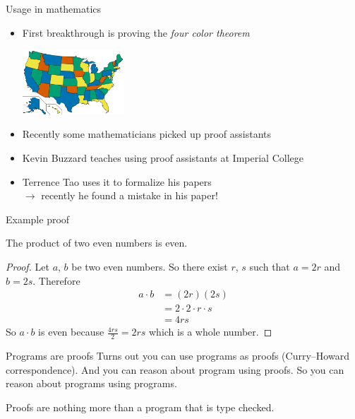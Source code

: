 \documentclass[compress,12pt,xcolor={dvipsnames}]{beamer}
\begin{document}
\begin{frame}{Usage in mathematics}
    \begin{itemize}
        \item First breakthrough is proving the \textit{four color theorem}
              \begin{center} \includegraphics[width=0.3\textwidth]{map_coloring.png} \end{center}
        \item Recently some mathematicians picked up proof assistants
        \item Kevin Buzzard teaches using proof assistants at Imperial College
        \item Terrence Tao uses it to formalize his papers \\
              $\to$ recently he found a mistake in his paper!
    \end{itemize}
\end{frame}

\begin{frame}[fragile]{Example proof}
    \begin{theorem}
        The product of two even numbers is even.
    \end{theorem}

    \begin{proof}
        Let $a$, $b$ be two even numbers. So there exist $r$, $s$ such that $a = 2r$ and $b = 2s$. Therefore
        \begin{align}
            a \cdot b & = (2r)(2s)                  \\
                      & = 2 \cdot 2 \cdot r \cdot s \\
                      & = 4rs
        \end{align}
        So $a \cdot b$ is even because $\frac{4rs}{2} = 2rs$ which is a whole number.
    \end{proof}
\end{frame}

\begin{frame}{Programs are proofs}
    Turns out you can use programs as proofs (Curry–Howard correspondence). And you can reason about program using proofs. So you can reason about programs using programs.

    Proofs are nothing more than a program that is type checked.
\end{frame}
\end{document}
